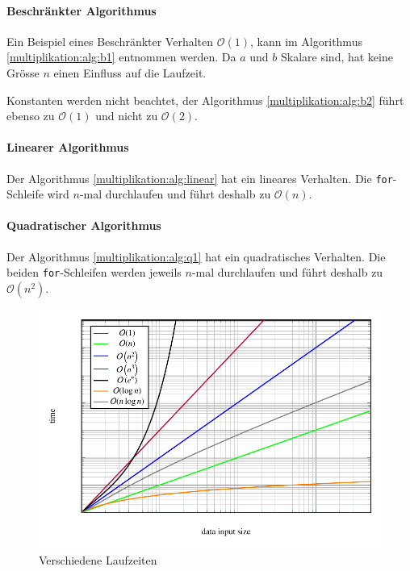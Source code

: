 \paragraph{Beschr\"ankter Algorithmus}

Ein Beispiel eines Beschr\"ankter Verhalten $\mathcal{O}(1)$, kann im Algorithmus \ref{multiplikation:alg:b1} entnommen werden. Da $a$ und $b$ Skalare sind, hat keine Gr\"osse $n$ einen Einfluss auf die Laufzeit.

Konstanten werden nicht beachtet, der Algorithmus \ref{multiplikation:alg:b2} f\"uhrt ebenso zu  $\mathcal{O}(1)$ und nicht zu $\mathcal{O}(2)$.


\paragraph{Linearer Algorithmus}

Der Algorithmus \ref{multiplikation:alg:linear} hat ein lineares Verhalten.
Die \texttt{for}-Schleife wird $n$-mal durchlaufen und f\"uhrt deshalb zu $\mathcal{O}(n)$.

\paragraph{Quadratischer Algorithmus}

Der Algorithmus \ref{multiplikation:alg:q1} hat ein quadratisches Verhalten.
Die beiden \texttt{for}-Schleifen werden jeweils $n$-mal durchlaufen und f\"uhrt deshalb zu $\mathcal{O}\left(n^2\right)$.


\begin{figure}
	\center
	\includegraphics[]{papers/multiplikation/images/bigo}
	\caption{Verschiedene Laufzeiten}
	\label{multiplikation:fig:bigo}
\end{figure}
